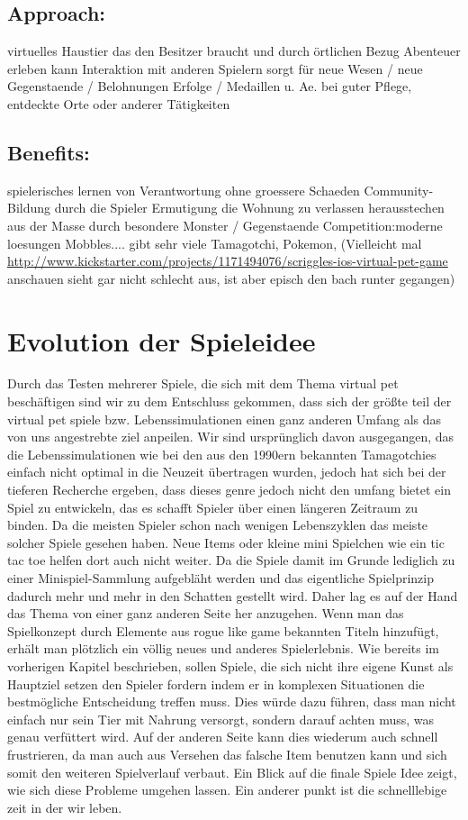 \subsection{Approach:}
virtuelles Haustier das den Besitzer braucht und durch örtlichen Bezug Abenteuer erleben kann 
Interaktion mit anderen Spielern sorgt für neue Wesen / neue Gegenstaende / Belohnungen 
Erfolge / Medaillen u. Ae. bei guter Pflege, entdeckte Orte oder anderer Tätigkeiten

\subsection{Benefits:} 
spielerisches lernen von Verantwortung ohne groessere Schaeden
Community-Bildung durch die Spieler
Ermutigung die Wohnung zu verlassen
herausstechen aus der Masse durch besondere Monster / Gegenstaende
Competition:moderne loesungen 
Mobbles.... gibt sehr viele
Tamagotchi, Pokemon,
(Vielleicht mal \url{http://www.kickstarter.com/projects/1171494076/scriggles-ios-virtual-pet-game} anschauen 
sieht gar nicht schlecht aus, ist aber episch den bach runter gegangen)

\section{Evolution der Spieleidee} 
Durch das Testen mehrerer Spiele, die sich mit dem Thema virtual pet beschäftigen sind wir zu dem Entschluss gekommen,  dass sich der größte teil der virtual pet spiele bzw. Lebenssimulationen einen ganz anderen Umfang als das von uns angestrebte ziel anpeilen. Wir sind ursprünglich davon ausgegangen, das die Lebenssimulationen wie bei den aus den 1990ern bekannten Tamagotchies einfach nicht optimal in die Neuzeit übertragen wurden, jedoch hat sich bei der tieferen Recherche ergeben, dass dieses genre jedoch nicht den umfang bietet ein Spiel zu entwickeln, das es schafft Spieler über einen längeren Zeitraum zu binden. Da die meisten Spieler schon nach wenigen Lebenszyklen das meiste solcher Spiele gesehen haben. Neue Items oder kleine mini Spielchen wie ein tic tac toe helfen dort auch nicht weiter. Da die Spiele damit im Grunde lediglich zu einer Minispiel-Sammlung aufgebläht werden und das eigentliche Spielprinzip dadurch mehr und mehr in den Schatten gestellt wird. Daher lag es auf der Hand das Thema von einer ganz anderen Seite her anzugehen. Wenn man das Spielkonzept durch Elemente aus rogue like game bekannten Titeln hinzufügt, erhält man plötzlich ein völlig neues und anderes Spielerlebnis.
Wie bereits im vorherigen Kapitel beschrieben, sollen Spiele, die sich nicht ihre eigene Kunst als Hauptziel setzen den Spieler fordern indem er in komplexen Situationen die bestmögliche Entscheidung treffen muss. Dies würde dazu führen, dass man nicht einfach nur sein Tier mit Nahrung versorgt, sondern darauf achten muss, was genau verfüttert wird. 
Auf der anderen Seite kann dies wiederum auch schnell frustrieren, da man auch aus Versehen das falsche Item benutzen kann und sich somit den weiteren Spielverlauf verbaut.
Ein Blick auf die finale Spiele Idee zeigt, wie sich diese Probleme umgehen lassen. 
Ein anderer punkt ist die schnelllebige zeit in der wir leben.

